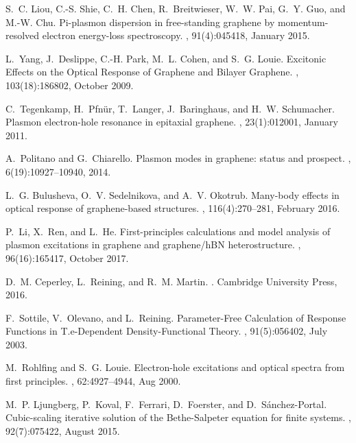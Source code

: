 \documentclass[aps,prb,10pt,showpacs,superscriptaddress,twocolumn,notitlepage]{revtex4-1}
\begin{document}
\begin{thebibliography}{10}
S.~C. Liou, C.-S. Shie, C.~H. Chen, R.~Breitwieser, W.~W. Pai, G.~Y. Guo, and
  M.-W. Chu.
\newblock Pi-plasmon dispersion in free-standing graphene by momentum-resolved
  electron energy-loss spectroscopy.
, 91(4):045418, January 2015.

L.~Yang, J.~Deslippe, C.-H. Park, M.~L. Cohen, and S.~G. Louie.
\newblock Excitonic {Effects} on the {Optical} {Response} of {Graphene} and
  {Bilayer} {Graphene}.
, 103(18):186802, October 2009.

C.~Tegenkamp, H.~Pfn{\"u}r, T.~Langer, J.~Baringhaus, and H.~W. Schumacher.
\newblock Plasmon electron-hole resonance in epitaxial graphene.
, 23(1):012001, January 2011.

A.~Politano and G.~Chiarello.
\newblock Plasmon modes in graphene: status and prospect.
, 6(19):10927--10940, 2014.

L.~G. Bulusheva, O.~V. Sedelnikova, and A.~V. Okotrub.
\newblock Many-body effects in optical response of graphene-based structures.
, 116(4):270--281, February 2016.

P.~Li, X.~Ren, and L.~He.
\newblock First-principles calculations and model analysis of plasmon
  excitations in graphene and graphene/{hBN} heterostructure.
, 96(16):165417, October 2017.

D.~M. Ceperley, L.~Reining, and R.~M. Martin.
.
\newblock Cambridge University Press, 2016.

F.~Sottile, V.~Olevano, and L.~Reining.
\newblock Parameter-{Free} {Calculation} of {Response} {Functions} in
  {T.e}-{Dependent} {Density}-{Functional} {Theory}.
, 91(5):056402, July 2003.

M.~Rohlfing and S.~G. Louie.
\newblock Electron-hole excitations and optical spectra from first principles.
, 62:4927--4944, Aug 2000.

M.~P. Ljungberg, P.~Koval, F.~Ferrari, D.~Foerster, and D.~S{\'a}nchez-Portal.
\newblock Cubic-scaling iterative solution of the {Bethe}-{Salpeter} equation
  for finite systems.
, 92(7):075422, August 2015.


\end{thebibliography}
\end{document}
